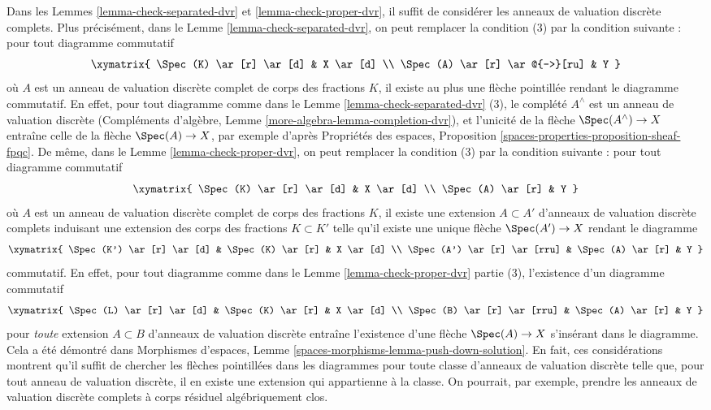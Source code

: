 \begin{remark}
\label{remark-variant}
Dans les Lemmes \ref{lemma-check-separated-dvr} et \ref{lemma-check-proper-dvr},
il suffit de considérer les anneaux de valuation discrète complets.
Plus précisément, dans le Lemme \ref{lemma-check-separated-dvr}, on peut remplacer
la condition (3) par la condition suivante : pour tout diagramme commutatif
$$
\xymatrix{
\Spec(K) \ar[r] \ar[d] & X \ar[d] \\
\Spec(A) \ar[r] \ar@{-->}[ru] & Y
}
$$
où $A$ est un anneau de valuation discrète complet de corps des fractions $K$,
il existe au plus une flèche pointillée rendant le diagramme commutatif. En effet, pour
tout diagramme comme dans le Lemme \ref{lemma-check-separated-dvr} (3),
le complété $A^\wedge$ est un anneau de valuation discrète
(Compléments d'algèbre, Lemme \ref{more-algebra-lemma-completion-dvr}),
et l'unicité de la flèche $\Spec(A^\wedge) \to X$
entraîne celle de la flèche $\Spec(A) \to X$,
par exemple d'après Propriétés des espaces, Proposition
\ref{spaces-properties-proposition-sheaf-fpqc}.
De même, dans le Lemme \ref{lemma-check-proper-dvr},
on peut remplacer la condition (3) par la condition suivante :
pour tout diagramme commutatif
$$
\xymatrix{
\Spec(K) \ar[r] \ar[d] & X \ar[d] \\
\Spec(A) \ar[r] & Y
}
$$
où $A$ est un anneau de valuation discrète complet de corps des fractions $K$,
il existe une extension $A \subset A'$ d'anneaux de valuation discrète complets
induisant une extension des corps des fractions $K \subset K'$ telle qu'il existe une
unique flèche $\Spec(A') \to X$ rendant le diagramme
$$
\xymatrix{
\Spec(K') \ar[r] \ar[d] & \Spec(K) \ar[r] & X \ar[d] \\
\Spec(A') \ar[r] \ar[rru] & \Spec(A) \ar[r] & Y
}
$$
commutatif. En effet, pour tout diagramme comme dans le Lemme \ref{lemma-check-proper-dvr}
partie (3), l'existence d'un diagramme commutatif
$$
\xymatrix{
\Spec(L) \ar[r] \ar[d] & \Spec(K) \ar[r] & X \ar[d] \\
\Spec(B) \ar[r] \ar[rru] & \Spec(A) \ar[r] & Y
}
$$
pour {\it toute} extension $A \subset B$ d'anneaux de valuation discrète
entraîne l'existence d'une flèche $\Spec(A) \to X$ s'insérant dans
le diagramme. Cela a été démontré dans
Morphismes d'espaces, Lemme \ref{spaces-morphisms-lemma-push-down-solution}.
En fait, ces considérations montrent qu'il suffit de chercher
les flèches pointillées dans les diagrammes pour toute classe d'anneaux de valuation discrète
telle que, pour tout anneau de valuation discrète, il en existe une extension
qui appartienne à la classe. On pourrait, par exemple, prendre les anneaux de valuation
discrète complets à corps résiduel algébriquement clos.
\end{remark}







